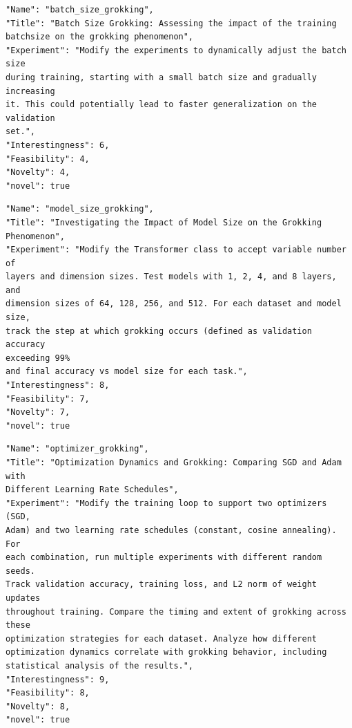 \documentclass[11pt, a4paper]{include/gdm_format}
\begin{document}
\begin{tcolorbox}[breakable,colback=blue!5!white, colframe=blue!75!black, title=Seed Idea - \texttt{batch\_size\_grokking}]
\small
\begin{verbatim}
"Name": "batch_size_grokking",
"Title": "Batch Size Grokking: Assessing the impact of the training
batchsize on the grokking phenomenon",
"Experiment": "Modify the experiments to dynamically adjust the batch size
during training, starting with a small batch size and gradually increasing
it. This could potentially lead to faster generalization on the validation
set.",
"Interestingness": 6,
"Feasibility": 4,
"Novelty": 4,
"novel": true
\end{verbatim}
\end{tcolorbox}

\begin{tcolorbox}[breakable,colback=blue!5!white, colframe=blue!75!black, title=Idea 1/50 - \texttt{model\_size\_grokking}]
\small
\begin{verbatim}
"Name": "model_size_grokking",
"Title": "Investigating the Impact of Model Size on the Grokking
Phenomenon",
"Experiment": "Modify the Transformer class to accept variable number of
layers and dimension sizes. Test models with 1, 2, 4, and 8 layers, and
dimension sizes of 64, 128, 256, and 512. For each dataset and model size,
track the step at which grokking occurs (defined as validation accuracy
exceeding 99%
and final accuracy vs model size for each task.",
"Interestingness": 8,
"Feasibility": 7,
"Novelty": 7,
"novel": true
\end{verbatim}
\end{tcolorbox}

\begin{tcolorbox}[breakable,colback=blue!5!white, colframe=blue!75!black, title=Idea 2/50 - \texttt{optimizer\_grokking}]
\small
\begin{verbatim}
"Name": "optimizer_grokking",
"Title": "Optimization Dynamics and Grokking: Comparing SGD and Adam with
Different Learning Rate Schedules",
"Experiment": "Modify the training loop to support two optimizers (SGD,
Adam) and two learning rate schedules (constant, cosine annealing). For
each combination, run multiple experiments with different random seeds.
Track validation accuracy, training loss, and L2 norm of weight updates
throughout training. Compare the timing and extent of grokking across these
optimization strategies for each dataset. Analyze how different
optimization dynamics correlate with grokking behavior, including
statistical analysis of the results.",
"Interestingness": 9,
"Feasibility": 8,
"Novelty": 8,
"novel": true
\end{verbatim}
\end{tcolorbox}
\end{document}

